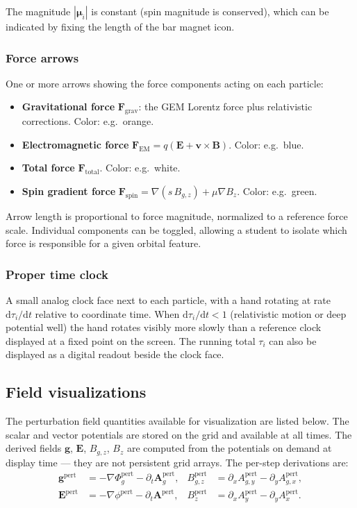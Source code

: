 \documentclass[11pt,a4paper]{article}
\newcommand{\vv}[1]{\mathbf{#1}}
\newcommand{\Phig}{\Phi_g}
\newcommand{\Ag}{\vv{A}_g}
\newcommand{\dd}{\mathrm{d}}
\begin{document}
The magnitude $|\boldsymbol{\mu}_i|$ is constant (spin magnitude is conserved), which can be indicated by fixing the length of the bar magnet icon.

\subsubsection*{Force arrows}

One or more arrows showing the force components acting on each particle:
\begin{itemize}
  \item \textbf{Gravitational force} $\vv{F}_{\mathrm{grav}}$: the GEM Lorentz force plus relativistic corrections.  Color: e.g.\ orange.
  \item \textbf{Electromagnetic force} $\vv{F}_{\mathrm{EM}} = q(\vv{E}+\vv{v}\times\vv{B})$.  Color: e.g.\ blue.
  \item \textbf{Total force} $\vv{F}_{\mathrm{total}}$.  Color: e.g.\ white.
  \item \textbf{Spin gradient force} $\vv{F}_{\mathrm{spin}} = \nabla(s\,B_{g,z}) + \mu\nabla B_z$.  Color: e.g.\ green.
\end{itemize}
Arrow length is proportional to force magnitude, normalized to a reference force scale.  Individual components can be toggled, allowing a student to isolate which force is responsible for a given orbital feature.

\subsubsection*{Proper time clock}

A small analog clock face next to each particle, with a hand rotating at rate $\dd\tau_i/\dd t$ relative to coordinate time.  When $\dd\tau_i/\dd t < 1$ (relativistic motion or deep potential well) the hand rotates visibly more slowly than a reference clock displayed at a fixed point on the screen.  The running total $\tau_i$ can also be displayed as a digital readout beside the clock face.

\subsection{Field visualizations}

The perturbation field quantities available for visualization are listed below.  The scalar and vector potentials are stored on the grid and available at all times.  The derived fields $\vv{g}$, $\vv{E}$, $B_{g,z}$, $B_z$ are computed from the potentials on demand at display time --- they are not persistent grid arrays.  The per-step derivations are:
\begin{align}
  \vv{g}^{\mathrm{pert}}    &= -\nabla\Phig^{\mathrm{pert}} - \partial_t\Ag^{\mathrm{pert}}, &
  B_{g,z}^{\mathrm{pert}}   &= \partial_x A_{g,y}^{\mathrm{pert}} - \partial_y A_{g,x}^{\mathrm{pert}}, \\
  \vv{E}^{\mathrm{pert}}    &= -\nabla\phi^{\mathrm{pert}} - \partial_t\vv{A}^{\mathrm{pert}},  &
  B_z^{\mathrm{pert}}       &= \partial_x A_y^{\mathrm{pert}} - \partial_y A_x^{\mathrm{pert}}.
\end{align}
\end{document}
